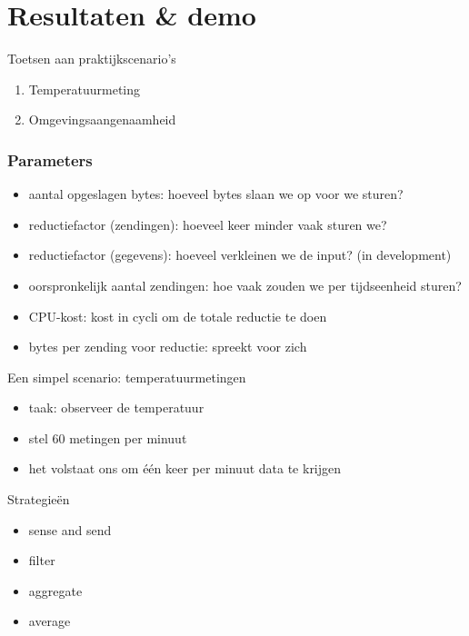 \documentclass[presentation, bigger]{beamer}
\begin{document}
\section{Resultaten \& demo}
\begin{frame}{Toetsen aan praktijkscenario's}

  \begin{enumerate}
  \item Temperatuurmeting
  \item Omgevingsaangenaamheid
  \end{enumerate}
\end{frame}

\begin{frame}
  \frametitle{Parameters}
  \begin{itemize}
  \item aantal opgeslagen bytes: hoeveel bytes slaan we op voor we sturen?
  \item reductiefactor (zendingen): hoeveel keer minder vaak sturen we?
  \item reductiefactor (gegevens): hoeveel verkleinen we de input? (in development)
  \item oorspronkelijk aantal zendingen: hoe vaak zouden we per tijdseenheid sturen?
  \item CPU-kost: kost in cycli om de totale reductie te doen
  \item bytes per zending voor reductie: spreekt voor zich
  \end{itemize}
\end{frame}

\begin{frame}{Een simpel scenario: temperatuurmetingen}
  \begin{itemize}
  \item taak: observeer de temperatuur
  \item stel 60 metingen per minuut
  \item het volstaat ons om \'e\'en keer per minuut data te krijgen
  \end{itemize}
\end{frame}

\begin{frame}{Strategie\"en}
  \begin{itemize}
  \item sense and send
  \item filter
  \item aggregate
  \item average
  \end{itemize}
\end{frame}
\end{document}
